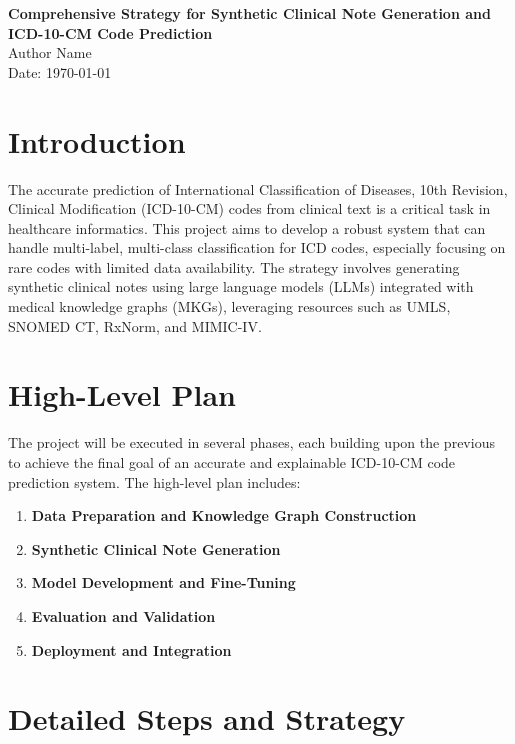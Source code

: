 \documentclass[12pt, a4paper]{article}
\begin{document}
\begin{center}
    \LARGE{\textbf{Comprehensive Strategy for Synthetic Clinical Note Generation and ICD-10-CM Code Prediction}}\\[1cm]
    \large{Author Name}\\
    \large{Date: \today}
\end{center}

\tableofcontents
\newpage

\section{Introduction}

The accurate prediction of International Classification of Diseases, 10th Revision, Clinical Modification (ICD-10-CM) codes from clinical text is a critical task in healthcare informatics. This project aims to develop a robust system that can handle multi-label, multi-class classification for ICD codes, especially focusing on rare codes with limited data availability. The strategy involves generating synthetic clinical notes using large language models (LLMs) integrated with medical knowledge graphs (MKGs), leveraging resources such as UMLS, SNOMED CT, RxNorm, and MIMIC-IV.

\section{High-Level Plan}

The project will be executed in several phases, each building upon the previous to achieve the final goal of an accurate and explainable ICD-10-CM code prediction system. The high-level plan includes:

\begin{enumerate}
    \item \textbf{Data Preparation and Knowledge Graph Construction}
    \item \textbf{Synthetic Clinical Note Generation}
    \item \textbf{Model Development and Fine-Tuning}
    \item \textbf{Evaluation and Validation}
    \item \textbf{Deployment and Integration}
\end{enumerate}

\section{Detailed Steps and Strategy}
\end{document}
